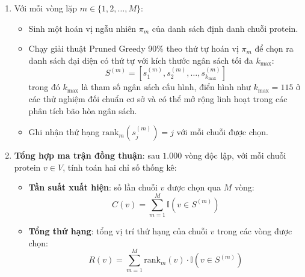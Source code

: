 \begin{enumerate}
    \item Với mỗi vòng lặp $m \in \{1, 2, \dots, M\}$:
    \begin{itemize}
        \item Sinh một hoán vị ngẫu nhiên $\pi_m$ của danh sách định danh chuỗi protein.
        \item Chạy giải thuật Pruned Greedy 90\% theo thứ tự hoán vị $\pi_m$ để chọn ra danh sách đại diện có thứ tự với kích thước ngân sách tối đa $k_{\max}$:
        \begin{equation}
        S^{(m)} = [s_1^{(m)}, s_2^{(m)}, \dots, s_{k_{\max}}^{(m)}]
        \end{equation}
        trong đó $k_{\max}$ là tham số ngân sách cấu hình, điển hình như $k_{\max} = 115$ ở các thử nghiệm đối chuẩn cơ sở và có thể mở rộng linh hoạt trong các phân tích bão hòa ngân sách.
        \item Ghi nhận thứ hạng $\text{rank}_m(s_j^{(m)}) = j$ với mỗi chuỗi được chọn.
    \end{itemize}
    
    \item \textbf{Tổng hợp ma trận đồng thuận}: sau $1.000$ vòng độc lập, với mỗi chuỗi protein $v \in V$, tính toán hai chỉ số thống kê:
    \begin{itemize}
        \item \textbf{Tần suất xuất hiện}: số lần chuỗi $v$ được chọn qua $M$ vòng:
        \begin{equation}
        C(v) = \sum_{m=1}^M \mathbb{I}\left(v \in S^{(m)}\right)
        \end{equation}
        \item \textbf{Tổng thứ hạng}: tổng vị trí thứ hạng của chuỗi $v$ trong các vòng được chọn:
        \begin{equation}
        R(v) = \sum_{m=1}^M \text{rank}_m(v) \cdot \mathbb{I}\left(v \in S^{(m)}\right)
        \end{equation}
    \end{itemize}
    

\end{enumerate}
